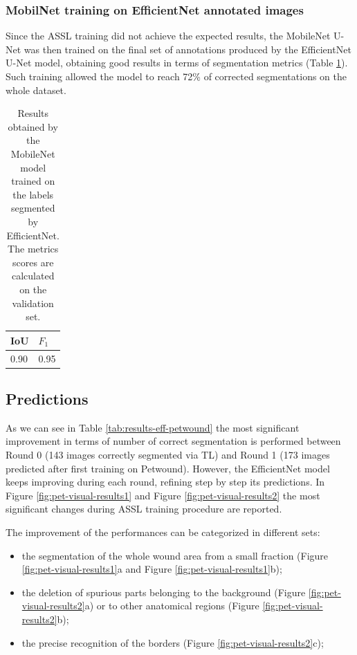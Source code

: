 \documentclass[../main.tex]{subfiles}
\begin{document}
\subsubsection{MobilNet training on EfficientNet annotated images}
Since the ASSL training did not achieve the expected results, the MobileNet U-Net was then trained on the final set of annotations produced by the EfficientNet U-Net model, obtaining good results in terms of segmentation metrics (Table \ref{tab:results-mob-score-petwound-noassl}).
Such training allowed the model to reach 72\% of corrected segmentations on the whole dataset.
\begin{table}[H]
    \centering
    
    \begin{tabular}{|l|l|}
    \hline
          IoU  & $F_1$  \\ \hline
        0.90 & 0.95 \\ \hline
    \end{tabular}
    \caption{Results obtained by the MobileNet model trained on the labels segmented by EfficientNet. The metrics scores are calculated on the validation set.}\label{tab:results-mob-score-petwound-noassl}
\end{table}
\subsection{Predictions}

As we can see in Table \ref{tab:results-eff-petwound} the most significant improvement in terms of number of correct segmentation is performed between Round 0 (143 images correctly segmented via TL) and Round 1 (173 images predicted after first training on Petwound).
However, the EfficientNet model keeps improving during each round, refining step by step its predictions.
In Figure \ref{fig:pet-visual-results1} and Figure \ref{fig:pet-visual-results2} the most significant changes during ASSL training procedure are reported.

The improvement of the performances can be categorized in different sets:
\begin{itemize}
    \item the segmentation of the whole wound area from a small fraction (Figure \ref{fig:pet-visual-results1}a and Figure \ref{fig:pet-visual-results1}b);
    \item the deletion of spurious parts belonging to the background (Figure \ref{fig:pet-visual-results2}a) or to other anatomical regions (Figure \ref{fig:pet-visual-results2}b);
    \item the precise recognition of the borders (Figure \ref{fig:pet-visual-results2}c);
\end{itemize}
\end{document}
